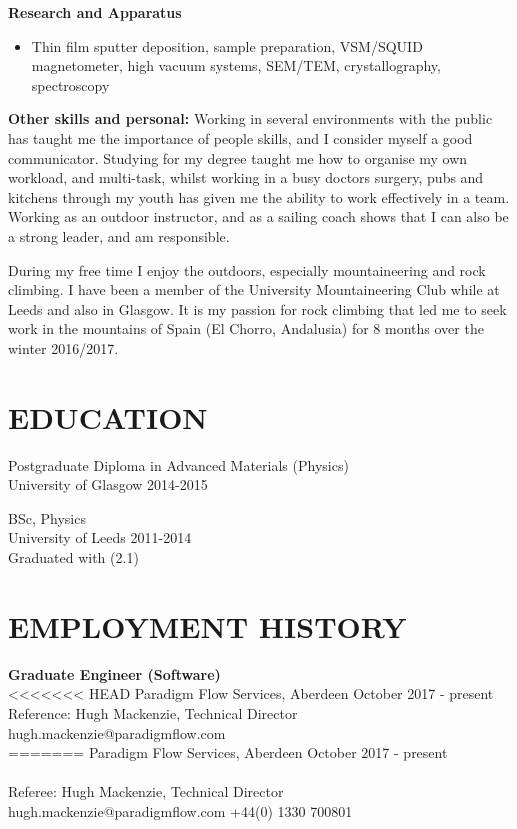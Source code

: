 \documentclass[margin, line, 10pt]{res} %
\begin{document}
\begin{resume}
\textbf{Research and Apparatus} 
\begin{itemize}
\item Thin film sputter deposition, sample preparation, VSM/SQUID magnetometer, high vacuum systems, SEM/TEM, crystallography, spectroscopy
\end{itemize}

\textbf{Other skills and personal:}
Working in several environments with the public has taught me the importance of  people skills, and I consider myself a good communicator. Studying for my degree taught me how to organise my own workload, and multi-task, whilst working in a busy doctors surgery, pubs and kitchens through my youth has given me the ability to work effectively in a team. Working as an outdoor instructor, and as a sailing coach shows that I can also be a strong leader, and am responsible.\

During my free time I enjoy the outdoors, especially mountaineering and rock climbing. I have been a member of the University Mountaineering Club while at Leeds and also in Glasgow. It is my passion for rock climbing that led me to seek work in the mountains of Spain (El Chorro, Andalusia) for 8 months over the winter 2016/2017.

\section{EDUCATION}

Postgraduate Diploma in Advanced Materials (Physics)\\
University of Glasgow 2014-2015 \

BSc, Physics \\
University of Leeds 2011-2014 \\
Graduated with (2.1) 

\section{EMPLOYMENT HISTORY}

\textbf{Graduate Engineer (Software)} \\
<<<<<<< HEAD
Paradigm Flow Services, Aberdeen \hfill October 2017 - present\\
Reference: Hugh Mackenzie, Technical Director\\
hugh.mackenzie@paradigmflow.com \\
=======
Paradigm Flow Services, Aberdeen \hfill October 2017 - present\\\\
Referee: Hugh Mackenzie, Technical Director \\
hugh.mackenzie@paradigmflow.com +44(0) 1330 700801\\


\end{resume}
\end{document}
